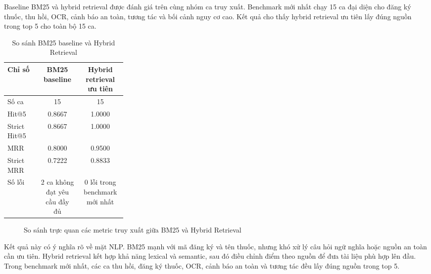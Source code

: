 Baseline BM25 và hybrid retrieval được đánh giá trên cùng nhóm ca truy xuất. Benchmark mới nhất chạy 15 ca đại diện cho đăng ký thuốc, thu hồi, OCR, cảnh báo an toàn, tương tác và bối cảnh nguy cơ cao. Kết quả cho thấy hybrid retrieval ưu tiên lấy đúng nguồn trong top 5 cho toàn bộ 15 ca.

\begin{table}[H]
\centering
\small
\caption{So sánh BM25 baseline và Hybrid Retrieval}
\begin{tabularx}{\linewidth}{p{0.28\linewidth} C C}
\toprule
\textbf{Chỉ số} & \textbf{BM25 baseline} & \textbf{Hybrid retrieval ưu tiên} \\
\midrule
Số ca & 15 & 15 \\
Hit@5 & 0.8667 & 1.0000 \\
Strict Hit@5 & 0.8667 & 1.0000 \\
MRR & 0.8000 & 0.9500 \\
Strict MRR & 0.7222 & 0.8833 \\
Số lỗi & 2 ca không đạt yêu cầu đầy đủ & 0 lỗi trong benchmark mới nhất \\
\bottomrule
\end{tabularx}
\end{table}

\begin{figure}[H]
\centering
{}
\caption{So sánh trực quan các metric truy xuất giữa BM25 và Hybrid Retrieval}
\end{figure}

Kết quả này có ý nghĩa rõ về mặt NLP. BM25 mạnh với mã đăng ký và tên thuốc, nhưng khó xử lý câu hỏi ngữ nghĩa hoặc nguồn an toàn cần ưu tiên. Hybrid retrieval kết hợp khả năng lexical và semantic, sau đó điều chỉnh điểm theo nguồn để đưa tài liệu phù hợp lên đầu. Trong benchmark mới nhất, các ca thu hồi, đăng ký thuốc, OCR, cảnh báo an toàn và tương tác đều lấy đúng nguồn trong top 5.

